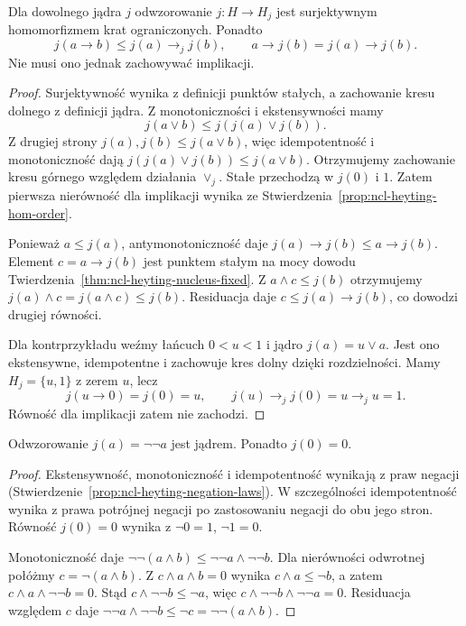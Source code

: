 \begin{stwierdzenie}
\label{prop:ncl-heyting-nucleus-projection}
Dla dowolnego jądra $j$ odwzorowanie
$j:H\to H_j$ jest surjektywnym homomorfizmem krat
ograniczonych. Ponadto
\[
 j(a\to b)\leq j(a)\to_j j(b),\qquad
 a\to j(b)=j(a)\to j(b).
\]
Nie musi ono jednak zachowywać implikacji.
\end{stwierdzenie}
\begin{proof}
Surjektywność wynika z definicji punktów stałych,
a zachowanie kresu dolnego z definicji jądra.
Z monotoniczności i ekstensywności mamy
\[
 j(a\vee b)\leq j(j(a)\vee j(b)).
\]
Z drugiej strony $j(a),j(b)\leq j(a\vee b)$,
więc idempotentność i monotoniczność dają
$j(j(a)\vee j(b))\leq j(a\vee b)$.
Otrzymujemy zachowanie kresu górnego względem
działania $\vee_j$. Stałe przechodzą w $j(0)$ i $1$.
Zatem pierwsza nierówność dla implikacji wynika ze
Stwierdzenia~\ref{prop:ncl-heyting-hom-order}.

Ponieważ $a\leq j(a)$, antymonotoniczność daje
$j(a)\to j(b)\leq a\to j(b)$.
Element $c=a\to j(b)$ jest punktem stałym na mocy
dowodu Twierdzenia~\ref{thm:ncl-heyting-nucleus-fixed}.
Z $a\wedge c\leq j(b)$ otrzymujemy
$j(a)\wedge c=j(a\wedge c)\leq j(b)$.
Residuacja daje $c\leq j(a)\to j(b)$,
co dowodzi drugiej równości.

Dla kontrprzykładu weźmy łańcuch $0<u<1$ i jądro
$j(a)=u\vee a$. Jest ono ekstensywne, idempotentne
i zachowuje kres dolny dzięki rozdzielności.
Mamy $H_j=\{u,1\}$ z zerem $u$, lecz
\[
 j(u\to0)=j(0)=u,\qquad
 j(u)\to_j j(0)=u\to_j u=1.
\]
Równość dla implikacji zatem nie zachodzi.
\end{proof}

\begin{twierdzenie}
\label{thm:ncl-heyting-double-negation-nucleus}
Odwzorowanie $j(a)=\neg\neg a$ jest jądrem.
Ponadto $j(0)=0$.
\end{twierdzenie}
\begin{proof}
Ekstensywność, monotoniczność i idempotentność
wynikają z praw negacji
(Stwierdzenie~\ref{prop:ncl-heyting-negation-laws}).
W szczególności idempotentność wynika z prawa
potrójnej negacji po zastosowaniu negacji
do obu jego stron.
Równość $j(0)=0$ wynika z $\neg0=1$, $\neg1=0$.

Monotoniczność daje
$\neg\neg(a\wedge b)\leq\neg\neg a\wedge\neg\neg b$.
Dla nierówności odwrotnej połóżmy
$c=\neg(a\wedge b)$.
Z $c\wedge a\wedge b=0$ wynika
$c\wedge a\leq\neg b$, a zatem
$c\wedge a\wedge\neg\neg b=0$.
Stąd $c\wedge\neg\neg b\leq\neg a$,
więc
$c\wedge\neg\neg b\wedge\neg\neg a=0$.
Residuacja względem $c$ daje
$\neg\neg a\wedge\neg\neg b\leq\neg c
=\neg\neg(a\wedge b)$.
\end{proof}

